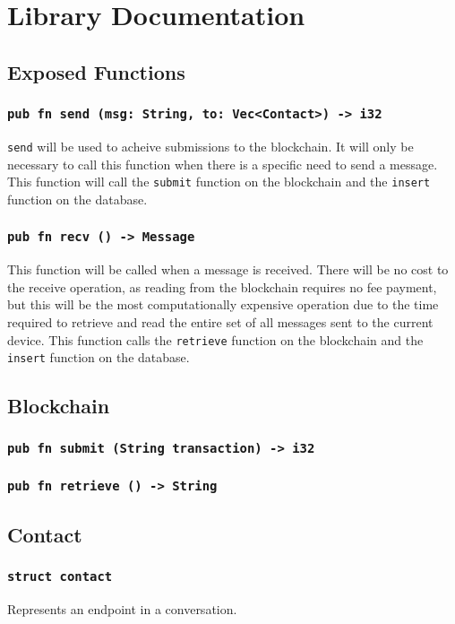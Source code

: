 \documentclass[]{article}
\begin{document}
\section{Library Documentation}

\subsection{Exposed Functions}
\subsubsection{\texttt{pub fn send (msg: String, to: Vec<Contact>) -> i32}}
\texttt{send} will be used to acheive submissions to the blockchain. It will only be necessary to call this function when there is a specific need to send a message. This function will call the \texttt{submit} function on the blockchain and the \texttt{insert} function on the database.
\subsubsection{\texttt{pub fn recv () -> Message}}
This function will be called when a message is received. There will be no cost to the receive operation, as reading from the blockchain requires no fee payment, but this will be the most computationally expensive operation due to the time required to retrieve and read the entire set of all messages sent to the current device. This function calls the \texttt{retrieve} function on the blockchain and the \texttt{insert} function on the database.

\subsection{Blockchain}
\subsubsection{\texttt{pub fn submit (String transaction) -> i32}}
\subsubsection{\texttt{pub fn retrieve () -> String}}

\subsection{Contact}
\subsubsection{\texttt{struct contact}}
Represents an endpoint in a conversation.
\end{document}
